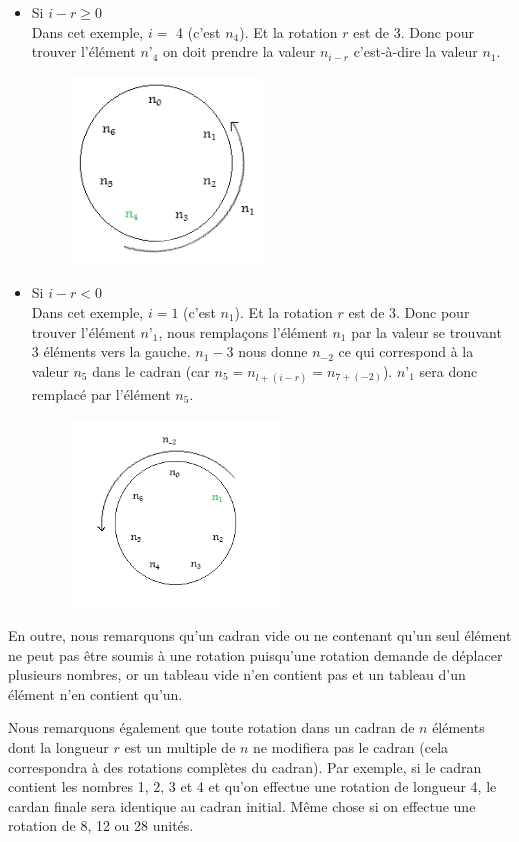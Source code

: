 	\begin{itemize}
		\item Si $ i - r \geq0 $ \\
		Dans cet exemple, $i=$ 4 (c’est $n_4$). Et la rotation $r$ est de 3. Donc pour trouver l’élément $n’_4$ on doit prendre la valeur $n_{i-r}$ c’est-à-dire la valeur $n_1$.
		\begin{figure}[h]
			\centering
			\includegraphics[height=5cm]{3}
			\caption{}
		\end{figure}
		\item Si $ i - r < 0 $ \\
		Dans cet exemple, $i=1$ (c’est $n_1$). Et la rotation $r$ est de 3. Donc pour trouver l’élément $n’_1$, nous remplaçons l’élément $n_1$ par la valeur se trouvant 3 éléments vers la gauche. $n_1 - 3$ nous donne $n_{-2}$ ce qui correspond à la valeur $n_5$ dans le cadran (car $n_5 = n_{l+(i-r)}=n_{7+(-2)}$). $n’_1$ sera donc remplacé par l’élément $n_5$.
		\begin{figure}[h]
			\centering
			\includegraphics[height=5cm]{4}
			\caption{}
		\end{figure}		
	\end{itemize}
	
	En outre, nous remarquons qu’un cadran vide ou ne contenant qu’un seul élément ne peut pas être soumis à une rotation puisqu’une rotation demande de déplacer plusieurs nombres, or un tableau vide n’en contient pas et un tableau d’un élément n’en contient qu’un.
	
	Nous remarquons également que toute rotation dans un cadran de $n$ éléments dont la longueur $r$ est un multiple de $n$ ne modifiera pas le cadran (cela correspondra à des rotations complètes du cadran). Par exemple, si le cadran contient les nombres 1, 2, 3 et 4 et qu’on effectue une rotation de longueur 4, le cardan finale sera identique au cadran initial. Même chose si on effectue une rotation de 8, 12 ou 28 unités.
	
